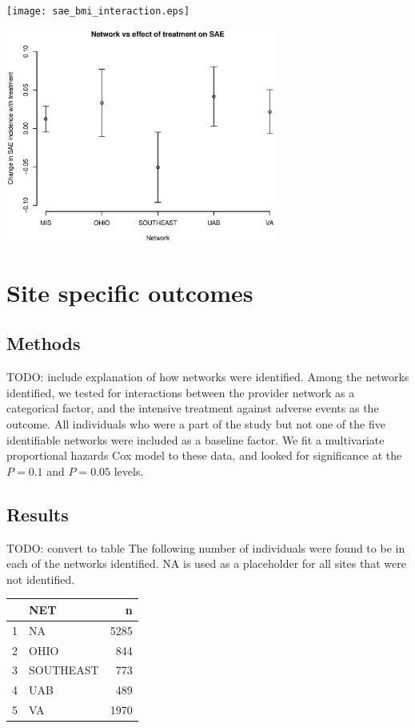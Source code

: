\documentclass[10pt]{article}
\begin{document}
\texttt{[image: sae\_bmi\_interaction.eps]}

\includegraphics[width=3.5in]{sae_network_interaction.eps}

\section{Site specific outcomes}
\subsection{Methods}
TODO: include explanation of how networks were identified.
Among the networks identified, we tested for interactions between the provider
network as a categorical factor, and the intensive treatment against adverse
events as the outcome. All individuals who were a part of the study but not one
of the five identifiable networks were included as a baseline factor. We fit a
multivariate proportional hazards Cox model to these data, and looked for
significance at the $P = 0.1$ and $P=0.05$ levels.

\subsection{Results}
TODO: convert to table
The following number of individuals were found to be in each of the networks
identified. NA is used as a placeholder for all sites that were not identified.

\begin{center}
\begin{tabular}{ |c|l|r| } 
 \hline
 &      \textbf{NET}&   \textbf{n} \\
 \hline
1&       NA&5285 \\
 \hline
2&     OHIO& 844 \\
 \hline
3&SOUTHEAST& 773 \\
 \hline
4      &UAB& 489 \\
 \hline
5      & VA&1970 \\
 \hline
\end{tabular}
\end{center}
\end{document}
